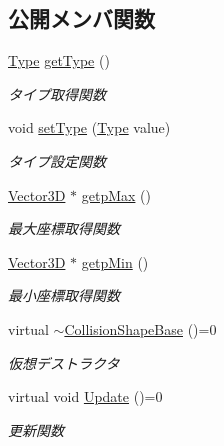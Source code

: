 \subsection*{公開メンバ関数}
\begin{DoxyCompactItemize}
\item 
\mbox{\hyperlink{class_collision_shape_base_a8abcef092855ad0ca191047044b002cb}{Type}} \mbox{\hyperlink{class_collision_shape_base_a3dac385b3718f80171046cde33da04b1}{get\+Type}} ()
\begin{DoxyCompactList}\small\item\em タイプ取得関数 \end{DoxyCompactList}\item 
void \mbox{\hyperlink{class_collision_shape_base_a82a91baac1983dab014be36864eecf54}{set\+Type}} (\mbox{\hyperlink{class_collision_shape_base_a8abcef092855ad0ca191047044b002cb}{Type}} value)
\begin{DoxyCompactList}\small\item\em タイプ設定関数 \end{DoxyCompactList}\item 
\mbox{\hyperlink{class_vector3_d}{Vector3D}} $\ast$ \mbox{\hyperlink{class_collision_shape_base_aec0443ca3ada3e6fd6e9b23e2463c9c9}{getp\+Max}} ()
\begin{DoxyCompactList}\small\item\em 最大座標取得関数 \end{DoxyCompactList}\item 
\mbox{\hyperlink{class_vector3_d}{Vector3D}} $\ast$ \mbox{\hyperlink{class_collision_shape_base_a426957f57223656c8ef26cec368288d0}{getp\+Min}} ()
\begin{DoxyCompactList}\small\item\em 最小座標取得関数 \end{DoxyCompactList}\item 
virtual \mbox{\hyperlink{class_collision_shape_base_af6fb40d8815d749743555bd2ab505fe6}{$\sim$\+Collision\+Shape\+Base}} ()=0
\begin{DoxyCompactList}\small\item\em 仮想デストラクタ \end{DoxyCompactList}\item 
virtual void \mbox{\hyperlink{class_collision_shape_base_a7aaa0f4de4e208f168f78e3445313929}{Update}} ()=0
\begin{DoxyCompactList}\small\item\em 更新関数 \end{DoxyCompactList}\end{DoxyCompactItemize}
